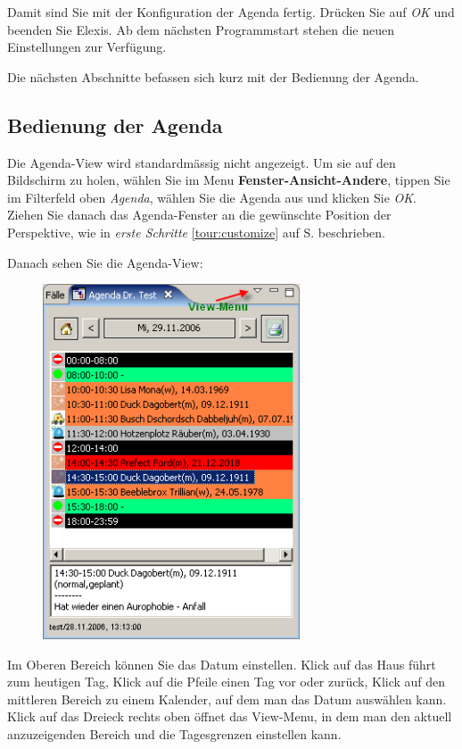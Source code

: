 Damit sind Sie mit der Konfiguration der Agenda fertig. Drücken Sie auf \textit{OK} und beenden Sie Elexis. Ab dem nächsten Programmstart stehen die neuen Einstellungen zur Verfügung.

Die nächsten Abschnitte befassen sich kurz mit der Bedienung der Agenda.
\subsection{Bedienung der Agenda}

Die Agenda-View wird standardmässig nicht angezeigt. Um sie auf den Bildschirm zu holen, wählen Sie im Menu
 \textbf{Fenster-Ansicht-Andere}, tippen Sie im Filterfeld oben \textit{Agenda}, wählen Sie die Agenda aus und
 klicken Sie \textit{OK}. Ziehen Sie danach das Agenda-Fenster an die gewünschte Position der Perspektive, wie in \textit{erste Schritte} \ref{tour:customize} auf S. \pageref{tour:customize} beschrieben.

Danach sehen Sie die Agenda-View:\\

\begin{figure}
\includegraphics[width=3in]{images/use2.png}
\end{figure}


Im Oberen Bereich können Sie das Datum einstellen. Klick auf das Haus führt zum heutigen Tag, Klick auf die Pfeile einen Tag vor oder
zurück, Klick auf den mittleren Bereich zu einem Kalender, auf dem man das Datum auswählen kann.
Klick auf das Dreieck rechts oben öffnet das View-Menu, in dem man den aktuell anzuzeigenden Bereich und die Tagesgrenzen
einstellen kann.

